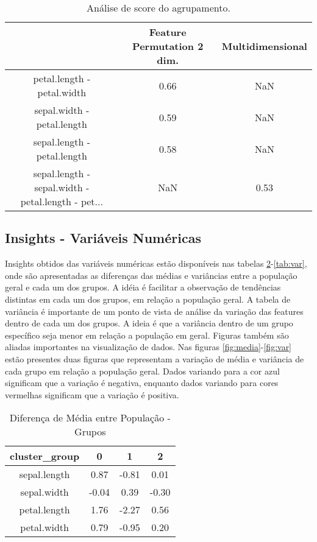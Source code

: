\documentclass{article}%
\begin{document}
\begin{table}[htbp]%
\caption{Análise de score do agrupamento.}%
\centering%
\begin{tabular}{ccc}
\toprule
{} &  Feature Permutation 2 dim. &  Multidimensional \\
\midrule
petal.length - petal.width                         &                        0.66 &               NaN \\
sepal.width - petal.length                         &                        0.59 &               NaN \\
sepal.length - petal.length                        &                        0.58 &               NaN \\
sepal.length - sepal.width - petal.length - pet... &                         NaN &              0.53 \\
\bottomrule
\end{tabular}
%
\label{tab:clustertypes}%
\end{table}

%
\subsection{Insights {-} Variáveis Numéricas}%
\label{subsec:Insights{-}VariveisNumricas}%
Insights obtidos das variáveis numéricas estão disponíveis nas tabelas \ref{tab:media}-\ref{tab:var}, onde são apresentadas as diferenças das médias e variâncias entre a população geral e cada um dos grupos. A idéia é facilitar a observação de tendências distintas em cada um dos grupos, em relação a população geral. A tabela de variância é importante de um ponto de vista de análise da variação das features dentro de cada um dos grupos. A ideia é que a variância dentro de um grupo específico seja menor em relação a população em geral.%
\newline%
Figuras também são aliadas importantes na visualização de dados. Nas figuras \ref{fig:media}-\ref{fig:var} estão presentes duas figuras que representam a variação de média e variância de cada grupo em relação a população geral. Dados variando para a cor azul significam que a variação é negativa, enquanto dados variando para cores vermelhas significam que a variação é positiva.%
\newline%


\begin{table}[htbp]%
\caption{Diferença de Média entre População {-} Grupos}%
\centering%
\begin{tabular}{cccc}
\toprule
cluster\_group &     0 &     1 &     2 \\
\midrule
sepal.length &  0.87 & -0.81 &  0.01 \\
sepal.width  & -0.04 &  0.39 & -0.30 \\
petal.length &  1.76 & -2.27 &  0.56 \\
petal.width  &  0.79 & -0.95 &  0.20 \\
\bottomrule
\end{tabular}
%
\label{tab:media}%
\end{table}
\end{document}
